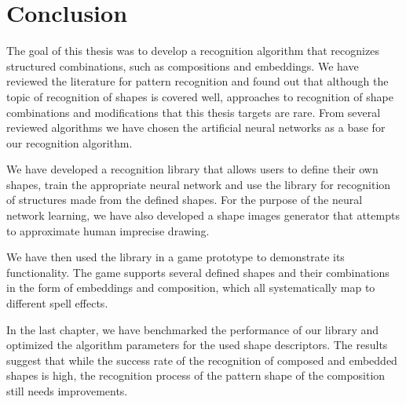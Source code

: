 \chapter*{Conclusion}
The goal of this thesis was to develop a recognition algorithm that recognizes structured combinations, such as compositions and embeddings. We have reviewed the literature for pattern recognition and found out that although the topic of recognition of shapes is covered well, approaches to recognition of shape combinations and modifications that this thesis targets are rare. From several reviewed algorithms we have chosen the artificial neural networks as a base for our recognition algorithm.

We have developed a recognition library that allows users to define their own shapes, train the appropriate neural network and use the library for recognition of structures made from the defined shapes. For the purpose of the neural network learning, we have also developed a shape images generator that attempts to approximate human imprecise drawing.

We have then used the library in a game prototype to demonstrate its functionality. The game supports several defined shapes and their combinations in the form of embeddings and composition, which all systematically map to different spell effects.

In the last chapter, we have benchmarked the performance of our library and optimized the algorithm parameters for the used shape descriptors. The results suggest that while the success rate of the recognition of composed and embedded shapes is high, the recognition process of the pattern shape of the composition still needs improvements. 

